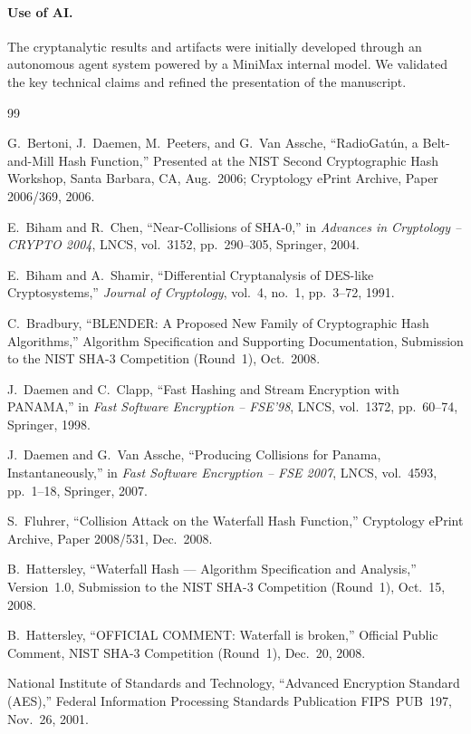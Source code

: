 \documentclass[11pt,a4paper]{article}
\theoremstyle{definition}
\theoremstyle{remark}
\begin{document}
\paragraph{Use of AI.}
The cryptanalytic results and artifacts were initially developed through an autonomous agent system powered by a MiniMax internal model. We validated the key technical claims and refined the presentation of the manuscript.

\begin{thebibliography}{99}

G.~Bertoni, J.~Daemen, M.~Peeters, and G.~Van Assche,
``RadioGat\'{u}n, a Belt-and-Mill Hash Function,'' Presented at the NIST Second Cryptographic Hash Workshop, Santa Barbara, CA, Aug.~2006; Cryptology ePrint Archive, Paper 2006/369, 2006.

E.~Biham and R.~Chen,
``Near-Collisions of SHA-0,'' in \emph{Advances in Cryptology -- CRYPTO 2004}, LNCS, vol.~3152, pp.~290--305, Springer, 2004.

E.~Biham and A.~Shamir,
``Differential Cryptanalysis of DES-like Cryptosystems,'' \emph{Journal of Cryptology}, vol.~4, no.~1, pp.~3--72, 1991.

C.~Bradbury,
``BLENDER: A Proposed New Family of Cryptographic Hash Algorithms,'' Algorithm Specification and Supporting Documentation, Submission to the NIST SHA-3 Competition (Round~1), Oct.~2008.

J.~Daemen and C.~Clapp,
``Fast Hashing and Stream Encryption with PANAMA,'' in \emph{Fast Software Encryption -- FSE'98}, LNCS, vol.~1372, pp.~60--74, Springer, 1998.

J.~Daemen and G.~Van Assche,
``Producing Collisions for Panama, Instantaneously,'' in \emph{Fast Software Encryption -- FSE 2007}, LNCS, vol.~4593, pp.~1--18, Springer, 2007.

S.~Fluhrer,
``Collision Attack on the Waterfall Hash Function,'' Cryptology ePrint Archive, Paper 2008/531, Dec.~2008.

B.~Hattersley,
``Waterfall Hash --- Algorithm Specification and Analysis,'' Version~1.0, Submission to the NIST SHA-3 Competition (Round~1), Oct.~15, 2008.

B.~Hattersley,
``OFFICIAL COMMENT: Waterfall is broken,'' Official Public Comment, NIST SHA-3 Competition (Round~1), Dec.~20, 2008.

National Institute of Standards and Technology,
``Advanced Encryption Standard (AES),'' Federal Information Processing Standards Publication FIPS~PUB~197, Nov.~26, 2001.


\end{thebibliography}
\end{document}

